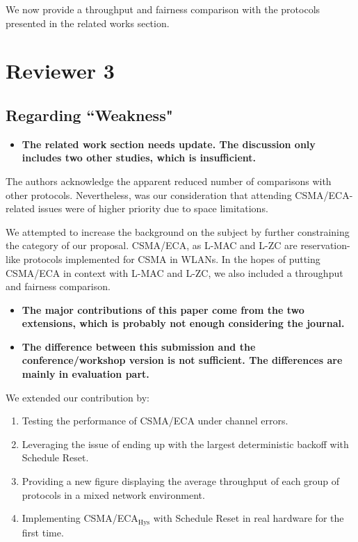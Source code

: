 \documentclass[]{article}
\begin{document}
		We now provide a throughput and fairness comparison with the protocols presented in the related works section.
		
\section{Reviewer 3}
	\subsection{Regarding ``Weakness"}
		\begin{itemize}
			\item {\bfseries The related work section needs update. The discussion only includes two other studies, which is insufficient.}
		\end{itemize}
		
		The authors acknowledge the apparent reduced number of comparisons with other protocols. Nevertheless, was our consideration that attending CSMA/ECA-related issues were of higher priority due to space limitations.
		
		We attempted to increase the background on the subject by further constraining the category of our proposal. CSMA/ECA, as L-MAC and L-ZC are reservation-like protocols implemented for CSMA in WLANs. In the hopes of putting CSMA/ECA in context with L-MAC and L-ZC, we also included a throughput and fairness comparison.
		
		\begin{itemize}
			\item {\bfseries The major contributions of this paper come from the two extensions, which is probably not enough considering the journal.}
			\item {\bfseries The difference between this submission and the conference/workshop version is not sufficient. The differences are mainly in evaluation part.}
		\end{itemize}
		
		We extended our contribution by:
			\begin{enumerate}
				\item Testing the performance of CSMA/ECA under channel errors.
				\item Leveraging the issue of ending up with the largest deterministic backoff with Schedule Reset.
				\item Providing a new figure displaying the average throughput of each group of protocols in a mixed network environment.
				\item Implementing CSMA/ECA$_{\text{Hys}}$ with Schedule Reset in real hardware for the first time.
			\end{enumerate}
			
\end{document}
